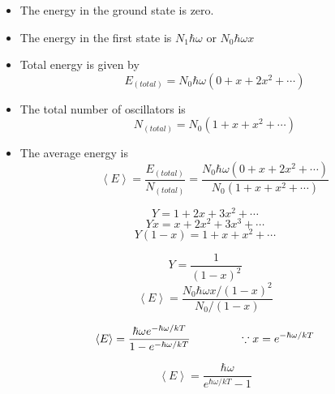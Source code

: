 \documentclass[aspectratio=169]{beamer}
\begin{document}
\begin{frame}

	\begin{itemize}
	
		\item The energy in the ground state is zero. \newline
		\item The energy in the first state is $ N_1 \hbar \omega $ or $ N_0 \hbar \omega x $ \newline
		\item Total energy is given by \[ E_{\left(total \right)} = N_0 \hbar \omega ( 0 + x + 2 x^2 + \cdots ) \] 
	
	\end{itemize}
	
\end{frame}
\begin{frame}
	\begin{itemize}

		\item The total number of oscillators is \[ N_{\left(total \right)} = N_0 ( 1 + x +  x^2 + \cdots ) \]  \newline
		\item  The average energy is \[ \left< E \right> = \frac{E_{\left(total \right)}}{N_{\left(total \right)}} = \dfrac{N_0 \hbar \omega ( 0 + x + 2 x^2 + \cdots )}{N_0 ( 1 + x + x^2 + \cdots )} \] \newline
		
	\end{itemize}
\end{frame}

\begin{frame}


		 \[ Y = 1 + 2 x + 3 x^2 + \cdots  \] \newline
		\[ Yx = x + 2 x ^ 2 + 3 x^3 + \cdots  \] \newline
		 \[ Y(1-x) = 1 + x + x^2 + \cdots  \]

\end{frame}

\begin{frame}

		\[ Y = \dfrac{1}{(1 - x )^2 } \] \newline
		\[ \left< E \right> = \dfrac{ N_0 \hbar \omega x / (1 - x )^2}{ N_0 / (1 - x )} \] 
\end{frame}

\begin{frame}{}

		\[ \left< E \right> =  \frac{\hbar \omega e^{-\hbar \omega / kT} }{1 - e^{-\hbar \omega / kT} } \hspace {1.5cm} \because x = e^{-\hbar \omega / kT}  \] 
		
		\begin{equation}	
		\boxed{ \left< E \right> = \frac{\hbar \omega}{e^{\hbar \omega / kT}-1} }
		\end{equation}
		
\end{frame}
\end{document}
